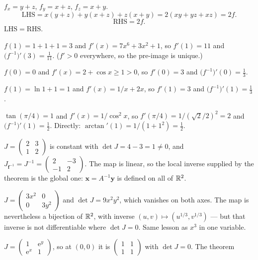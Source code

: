 \begin{solutions}
  \item $f_{x}=y+z$, $f_{y}=x+z$, $f_{z}=x+y$.
        \[
          \mathrm{LHS}=x(y+z)+y(x+z)+z(x+y)=2(xy+yz+xz)=2f .
        \]
        \[
          \mathrm{RHS}=2f .
        \]
        $\mathrm{LHS}=\mathrm{RHS}$. \checkmark
  \item $f(1)=1+1+1=3$ and $f'(x)=7x^{6}+3x^{2}+1$, so $f'(1)=11$ and
        $\bigl(f^{-1}\bigr)'(3)=\tfrac{1}{11}$. ($f'>0$ everywhere, so the
        pre-image is unique.)
  \item $f(0)=0$ and $f'(x)=2+\cos x\ge1>0$, so $f'(0)=3$ and
        $\bigl(f^{-1}\bigr)'(0)=\tfrac13$.
  \item $f(1)=\ln1+1=1$ and $f'(x)=1/x+2x$, so $f'(1)=3$ and
        $\bigl(f^{-1}\bigr)'(1)=\tfrac13$.
  \item $\tan(\pi/4)=1$ and $f'(x)=1/\cos^{2}x$, so
        $f'(\pi/4)=1/(\sqrt2/2)^{2}=2$ and
        $\bigl(f^{-1}\bigr)'(1)=\tfrac12$. Directly:
        $\arctan'(1)=1/(1+1^{2})=\tfrac12$. \checkmark
  \item $J=\begin{pmatrix}2&3\\1&2\end{pmatrix}$ is constant with
        $\det J=4-3=1\neq0$, and
        $J_{\mathbf{f}^{-1}}=J^{-1}
        =\begin{pmatrix}2&-3\\-1&2\end{pmatrix}$. The map is linear, so the
        local inverse supplied by the theorem is the global one:
        $\mathbf{x}=A^{-1}\mathbf{y}$ is defined on all of $\mathbb{R}^{2}$.
  \item $J=\begin{pmatrix}3x^{2}&0\\0&3y^{2}\end{pmatrix}$ and
        $\det J=9x^{2}y^{2}$, which vanishes on both axes. The map is
        nevertheless a bijection of $\mathbb{R}^{2}$, with inverse
        $(u,v)\mapsto(u^{1/3},v^{1/3})$ --- but that inverse is not
        differentiable where $\det J=0$. Same lesson as $x^{3}$ in one
        variable.
  \item $J=\begin{pmatrix}1&\mathrm{e}^{y}\\ \mathrm{e}^{x}&1\end{pmatrix}$,
        so at $(0,0)$ it is
        $\begin{pmatrix}1&1\\1&1\end{pmatrix}$ with $\det J=0$. The theorem

\end{solutions}
